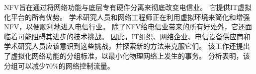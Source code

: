 \begin{conclusions}
    NFV旨在通过将网络功能与底层专有硬件分离来彻底改变电信业。
    它提供IT虚拟化平台的所有优势。
    学术研究人员和网络工程师正在利用虚拟环境来简化和增强NFV，以便顺利地进入电信行业。
    除了NFV给电信业带来的所有好处外，它还面临着可能阻碍其进步的技术挑战。
    因此，IT组织、网络企业、电信设备供应商和学术研究人员应该意识到这些挑战，并探索新的方法来克服它们。
    该工作还提出了虚拟化网络功能的分组标准，以最小化物理网络上发生的事务。
    分析表明，该分组可以减少70\%的网络控制流量。
\end{conclusions}
